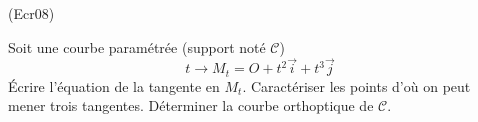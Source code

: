 \begin{tiny}(Ecr08)\end{tiny} Soit une courbe paramétrée (support noté $\mathcal C$)
\begin{displaymath}
 t\rightarrow M_t=O +t^2\overrightarrow i +t^3 \overrightarrow j
\end{displaymath} 
\'Ecrire l'équation de la tangente en $M_t$. Caractériser les points d'où on peut mener trois tangentes. Déterminer la courbe orthoptique de $\mathcal{C}$. 